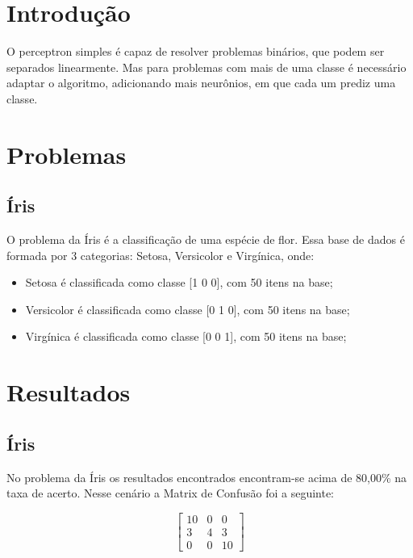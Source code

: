 \renewcommand{\figurename}{Figura}

\section{Introdução}

O perceptron simples é capaz de resolver problemas binários, que podem
ser separados linearmente. Mas para problemas com mais de uma classe é
necessário adaptar o algoritmo, adicionando mais neurônios, em que cada
um prediz uma classe.

\section{Problemas}

\subsection{Íris}

O problema da Íris é a classificação de uma espécie de flor. Essa base
de dados é formada por 3 categorias: Setosa, Versicolor e Virgínica,
onde:

\begin{itemize}
\tightlist
\item
  Setosa é classificada como classe {[}1 0 0{]}, com 50 itens na base;
\item
  Versicolor é classificada como classe {[}0 1 0{]}, com 50 itens na
  base;
\item
  Virgínica é classificada como classe {[}0 0 1{]}, com 50 itens na
  base;
\end{itemize}

\section{Resultados}

\subsection{Íris}

No problema da Íris os resultados encontrados encontram-se acima de
80,00\% na taxa de acerto. Nesse cenário a Matrix de Confusão foi a
seguinte:

\[
\begin{bmatrix}
10 & 0 & 0 \\
3 & 4 & 3 \\
0 & 0 & 10
\end{bmatrix}
\]

